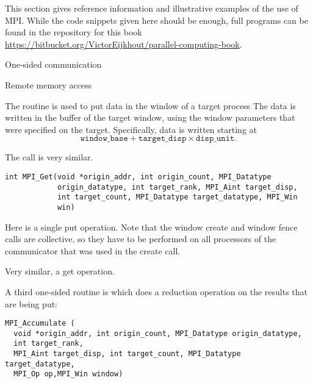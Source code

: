 
This section gives reference information and illustrative examples
of the use of MPI. While the code snippets given here should be enough,
full programs can be found in the repository for this book
\url{https://bitbucket.org/VictorEijkhout/parallel-computing-book}.

 {One-sided communication}

 {Remote memory access}

The  routine is used to put data in the window
of a target process
%
%
The data is written in the buffer of the target window,
using the window parameters that were specified on the target.
Specifically, data is written starting at
\[ \mathtt{window\_base} + \mathtt{target\_disp}\times \mathtt{disp\_unit}. \]

The  call is very similar.
\begin{verbatim}
int MPI_Get(void *origin_addr, int origin_count, MPI_Datatype
            origin_datatype, int target_rank, MPI_Aint target_disp,
            int target_count, MPI_Datatype target_datatype, MPI_Win
            win)
\end{verbatim}

Here is a single put operation. Note that the window create and window fence calls
are collective, so they have to be performed on all processors
of the communicator that was used in the create call.

Very similar, a get operation.

A third one-sided routine
is  which does a reduction operation on the results
that are being put:
\begin{verbatim}
MPI_Accumulate (
  void *origin_addr, int origin_count, MPI_Datatype origin_datatype, 
  int target_rank,
  MPI_Aint target_disp, int target_count, MPI_Datatype target_datatype,
  MPI_Op op,MPI_Win window)
\end{verbatim}

